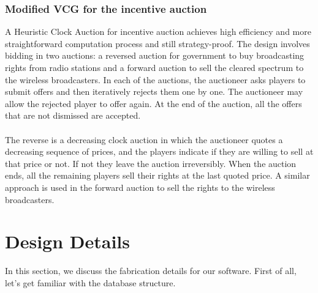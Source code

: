 \documentclass[a4paper]{article}
\begin{document}
\pagebreak
\subsubsection*{Modified VCG for the incentive auction}

A Heuristic Clock Auction for incentive auction achieves high efficiency and more straightforward computation process and still strategy-proof. The design involves bidding in two auctions: a reversed auction for government to buy broadcasting rights from radio stations and a forward auction to sell the cleared spectrum to the wireless broadcasters. In each of the auctions, the auctioneer asks players to submit offers and then iteratively rejects them one by one. The auctioneer may allow the rejected player to offer again. At the end of the auction, all the offers that are not dismissed are accepted.
\\\\
The reverse is a decreasing clock auction in which the auctioneer quotes a decreasing sequence of prices, and the players indicate if they are willing to sell at that price or not. If not they leave the auction irreversibly. When the auction ends, all the remaining players sell their rights at the last quoted price. A similar approach is used in the forward auction to sell the rights to the wireless broadcasters.



\pagebreak
\section*{Design Details}
In this section, we discuss the fabrication details for our software. 
First of all, let's get familiar with the database structure.
\end{document}
